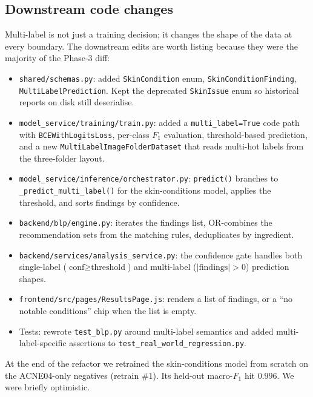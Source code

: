 \documentclass[11pt,a4paper,oneside]{report}
\begin{document}
\subsection{Downstream code changes}

Multi-label is not just a training decision; it changes the shape
of the data at every boundary. The downstream edits are worth
listing because they were the majority of the Phase-3 diff:

\begin{itemize}
    \item \texttt{shared/schemas.py}: added
        \texttt{SkinCondition} enum,
        \texttt{SkinConditionFinding},
        \texttt{MultiLabelPrediction}. Kept the deprecated
        \texttt{SkinIssue} enum so historical reports on disk still
        deserialise.
    \item \texttt{model\_service/training/train.py}: added a
        \texttt{multi\_label=True} code path with
        \texttt{BCEWithLogitsLoss}, per-class \(F_1\) evaluation,
        threshold-based prediction, and a new
        \texttt{MultiLabelImageFolderDataset} that reads multi-hot
        labels from the three-folder layout.
    \item \texttt{model\_service/inference/orchestrator.py}:
        \texttt{predict()} branches to
        \texttt{\_predict\_multi\_label()} for the skin-conditions
        model, applies the threshold, and sorts findings by
        confidence.
    \item \texttt{backend/blp/engine.py}: iterates the findings list,
        OR-combines the recommendation sets from the matching rules,
        deduplicates by ingredient.
    \item \texttt{backend/services/analysis\_service.py}: the
        confidence gate handles both single-label
        (\(\text{conf} \ge \text{threshold}\)) and multi-label
        (\(|\text{findings}| > 0\)) prediction shapes.
    \item \texttt{frontend/src/pages/ResultsPage.js}: renders a list
        of findings, or a ``no notable conditions'' chip when the
        list is empty.
    \item Tests: rewrote \texttt{test\_blp.py} around multi-label
        semantics and added multi-label-specific assertions to
        \texttt{test\_real\_world\_regression.py}.
\end{itemize}

At the end of the refactor we retrained the skin-conditions model
from scratch on the ACNE04-only negatives (retrain \#1). Its
held-out macro-\(F_1\) hit \(0.996\). We were briefly optimistic.
\end{document}
